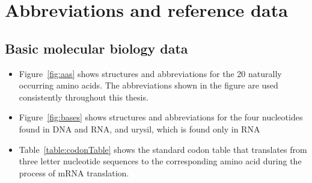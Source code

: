 \chapter{Abbreviations and reference data}

\section{Basic molecular biology data}

\begin{itemize}
\item     Figure~\vref{fig:aas} shows structures and abbreviations for the
    20 naturally occurring amino acids.  The abbreviations shown in
    the figure are used consistently throughout this thesis.

\item     Figure~\vref{fig:bases} shows structures and abbreviations for the
    four nucleotides found in DNA and RNA, and urysil, which is
    found only in RNA

    \item     Table~\vref{table:codonTable} shows the standard codon table
    that translates from three letter nucleotide sequences to the
    corresponding amino acid during the process of mRNA translation.
\end{itemize}


